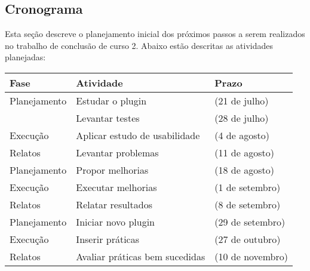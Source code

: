 \subsection{Cronograma}

Esta seção descreve o planejamento inicial dos próximos passos a serem realizados no trabalho de conclusão de curso 2. Abaixo estão descritas as atividades planejadas:

\begin{table}[h]
\centering
\begin{tabular}{|l|l|l|}
\hline
\textbf{Fase}            & \textbf{Atividade}             & \textbf{Prazo} \\ \hline
Planejamento             & Estudar o plugin               & (21 de julho)          \\ \hline
                         & Levantar testes                & (28 de julho)          \\ \hline
Execução                 & Aplicar estudo de usabilidade  & (4 de agosto)          \\ \hline
Relatos                  & Levantar problemas             & (11 de agosto)          \\ \hline
Planejamento             & Propor melhorias               & (18 de agosto)          \\ \hline
Execução                 & Executar melhorias             & (1 de setembro)          \\ \hline
Relatos                  & Relatar resultados             & (8 de setembro)          \\ \hline
Planejamento             & Iniciar novo plugin            & (29 de setembro)          \\ \hline
Execução                 & Inserir práticas               & (27 de outubro)          \\ \hline
Relatos                  & Avaliar práticas bem sucedidas & (10 de novembro)          \\ \hline
\end{tabular}
\end{table}


